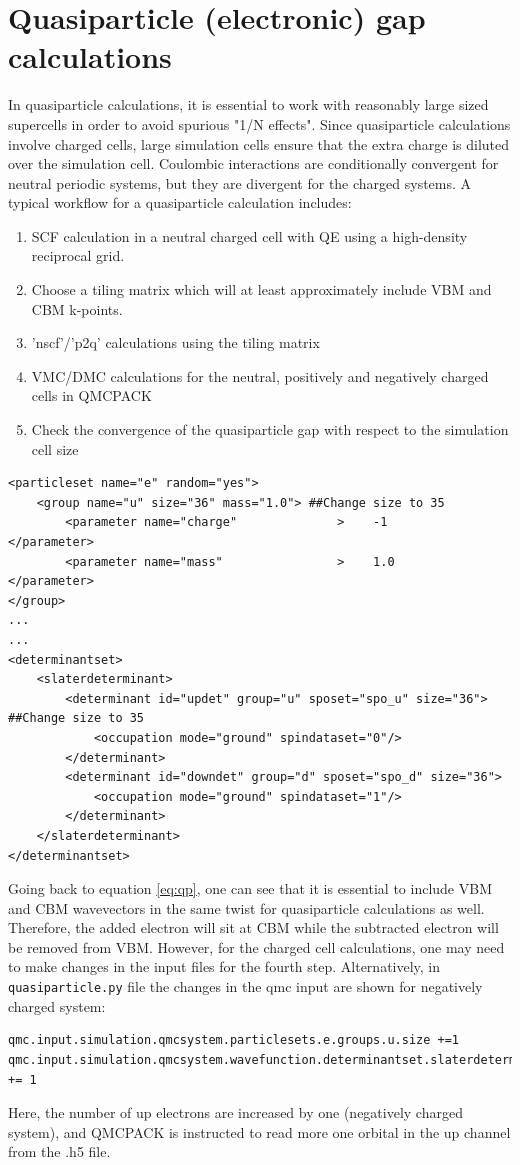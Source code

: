 \section{Quasiparticle (electronic) gap calculations}\label{sec:lab_ex_qp}
In quasiparticle calculations, it is essential to work with reasonably large sized supercells in order to avoid spurious "1/N effects". 
Since quasiparticle calculations involve charged cells, large simulation cells ensure that the extra charge is diluted over the simulation cell. Coulombic interactions are conditionally convergent for neutral periodic systems, but they are divergent for the charged systems. 
A typical workflow for a quasiparticle calculation includes:
\begin{enumerate}
	\item SCF calculation in a neutral charged cell with QE using a high-density reciprocal grid.
	\item Choose a tiling matrix which will at least approximately include VBM and CBM k-points. 
	\item 'nscf'/'p2q' calculations using the tiling matrix 
	\item VMC/DMC calculations for the neutral, positively and negatively charged cells in QMCPACK
	\item Check the convergence of the quasiparticle gap with respect to the simulation cell size
\end{enumerate}
\begin{lstlisting}
<particleset name="e" random="yes">
	<group name="u" size="36" mass="1.0"> ##Change size to 35
		<parameter name="charge"              >    -1                    </parameter>
		<parameter name="mass"                >    1.0                   </parameter>
</group>
...
...
<determinantset>
	<slaterdeterminant>
		<determinant id="updet" group="u" sposet="spo_u" size="36"> ##Change size to 35
		    <occupation mode="ground" spindataset="0"/>	
		</determinant>
		<determinant id="downdet" group="d" sposet="spo_d" size="36">
		    <occupation mode="ground" spindataset="1"/>	
		</determinant>
	</slaterdeterminant>
</determinantset>
\end{lstlisting}
Going back to equation \ref{eq:qp}, one can see that it is essential to include VBM and CBM wavevectors in the same twist for quasiparticle calculations as well. 
Therefore, the added electron will sit at CBM while the subtracted electron will be removed from VBM. 
However, for the charged cell calculations, one may need to make changes in the input files for the fourth step.  Alternatively, in \texttt{quasiparticle.py} file the changes in the qmc input are shown for negatively charged system:
\begin{lstlisting}
qmc.input.simulation.qmcsystem.particlesets.e.groups.u.size +=1
qmc.input.simulation.qmcsystem.wavefunction.determinantset.slaterdeterminant.determinants.updet.size += 1
\end{lstlisting}
Here, the number of up electrons are increased by one (negatively charged system), and QMCPACK is instructed to read more one orbital in the up channel from the .h5 file. 

